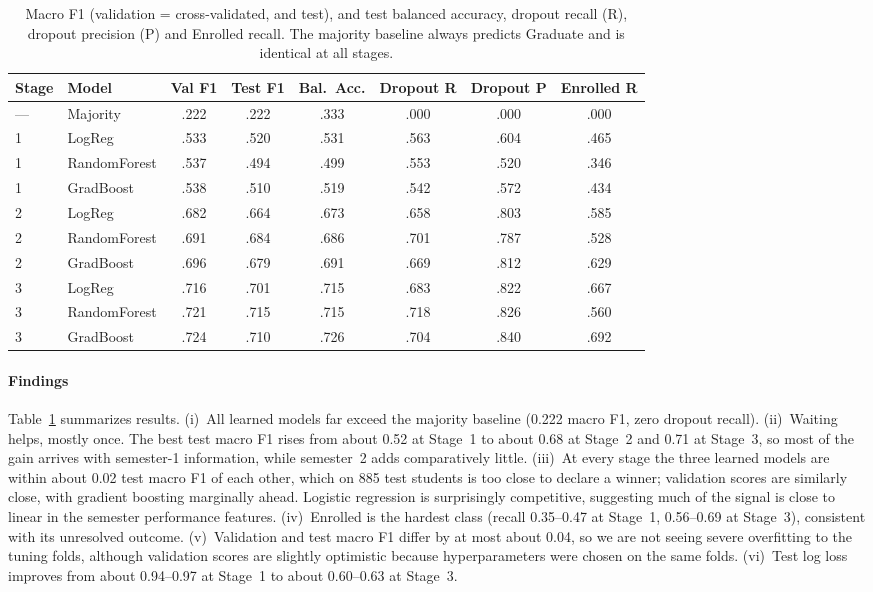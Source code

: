 \documentclass[11pt]{article}
\begin{document}
\begin{table}[t]
  \centering\small
  \begin{tabular}{llcccccc}
    \toprule
    Stage & Model & Val F1 & Test F1 & Bal.\ Acc. & Dropout R & Dropout P & Enrolled R \\
    \midrule
    --- & Majority & .222 & .222 & .333 & .000 & .000 & .000 \\
    \midrule
    1 & LogReg       & .533 & .520 & .531 & .563 & .604 & .465 \\
    1 & RandomForest & .537 & .494 & .499 & .553 & .520 & .346 \\
    1 & GradBoost    & .538 & .510 & .519 & .542 & .572 & .434 \\
    \midrule
    2 & LogReg       & .682 & .664 & .673 & .658 & .803 & .585 \\
    2 & RandomForest & .691 & .684 & .686 & .701 & .787 & .528 \\
    2 & GradBoost    & .696 & .679 & .691 & .669 & .812 & .629 \\
    \midrule
    3 & LogReg       & .716 & .701 & .715 & .683 & .822 & .667 \\
    3 & RandomForest & .721 & .715 & .715 & .718 & .826 & .560 \\
    3 & GradBoost    & .724 & .710 & .726 & .704 & .840 & .692 \\
    \bottomrule
  \end{tabular}
  \caption{Macro F1 (validation = cross-validated, and test), and test balanced accuracy, dropout recall (R), dropout precision (P) and Enrolled recall. The majority baseline always predicts Graduate and is identical at all stages.}
  \label{tab:results}
\end{table}

\paragraph{Findings} Table~\ref{tab:results} summarizes results. (i)~All learned models far exceed the majority baseline (0.222 macro F1, zero dropout recall). (ii)~Waiting helps, mostly once. The best test macro F1 rises from about 0.52 at Stage~1 to about 0.68 at Stage~2 and 0.71 at Stage~3, so most of the gain arrives with semester-1 information, while semester~2 adds comparatively little. (iii)~At every stage the three learned models are within about 0.02 test macro F1 of each other, which on 885 test students is too close to declare a winner; validation scores are similarly close, with gradient boosting marginally ahead. Logistic regression is surprisingly competitive, suggesting much of the signal is close to linear in the semester performance features. (iv)~Enrolled is the hardest class (recall 0.35--0.47 at Stage~1, 0.56--0.69 at Stage~3), consistent with its unresolved outcome. (v)~Validation and test macro F1 differ by at most about 0.04, so we are not seeing severe overfitting to the tuning folds, although validation scores are slightly optimistic because hyperparameters were chosen on the same folds. (vi)~Test log loss improves from about 0.94--0.97 at Stage~1 to about 0.60--0.63 at Stage~3.
\end{document}
